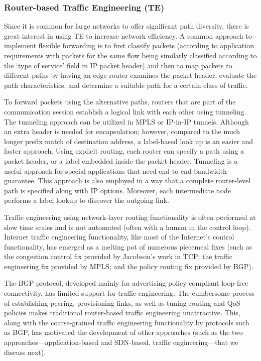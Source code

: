 \documentclass[10pt]{IEEEtran}
\begin{document}
\vspace{2mm}
\subsubsection{Router-based Traffic Engineering (TE)}
\label{subsec:TE}

Since it is common for large networks to offer significant path diversity, there is great interest in using TE to increase network efficiency. A common approach to implement flexible forwarding is to first classify packets (according to application requirements with packets for the same flow being similarly classified according to the `type of service' field in IP packet header) and then to map packets to different paths by having an edge router examines the packet header, evaluate the path characteristics, and determine a suitable path for a certain class of traffic. 

To forward packets using the alternative paths, routers that are part of the communication session establish a logical link with each other using tunneling. The tunneling approach can be utilized in MPLS or IP-in-IP tunnels. Although an extra header is needed for encapsulation; however, compared to the much longer prefix match of destination address, a label-based look up is an easier and faster approach. Using explicit routing, each router can specify a path using a packet header, or a label embedded inside the packet header. Tunneling is a useful approach for special applications that need end-to-end bandwidth guarantee. This approach is also employed in a way that a complete router-level path is specified along with IP options. Moreover, each intermediate node performs a label lookup to discover the outgoing link.



Traffic engineering using network-layer routing functionality is often performed at slow time scales and is not automated (often with a human in the control loop).  Internet traffic engineering functionality, like most of the Internet's control functionality, has emerged as a melting pot of numerous piecemeal fixes (such as the congestion control fix provided by Jacobson's work in TCP; the traffic engineering fix provided by MPLS; and the policy routing fix provided by BGP).

The BGP protocol, developed mainly for advertising policy-compliant loop-free connectivity, has limited support for traffic engineering. The cumbersome process of establishing peering, provisioning links, as well as tuning routing and QoS policies makes traditional router-based traffic engineering unattractive. This, along with the coarse-grained traffic engineering functionality by protocols such as BGP, has motivated the development of other approaches (such as the two approaches---application-based and SDN-based, traffic engineering---that we discuss next). 
\end{document}
